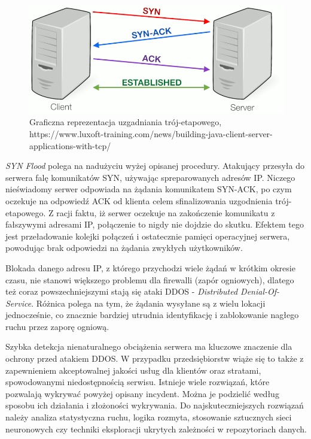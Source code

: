 \documentclass[12pt,twoside]{article}
\begin{document}
\begin{figure}[H]
	\centering
	\includegraphics[width=0.7\linewidth]{figures/3-way-handshake}
	\caption{Graficzna reprezentacja uzgadniania trój-etapowego, https://www.luxoft-training.com/news/building-java-client-server-applications-with-tcp/}
	\label{fig:3-way-handshake}
\end{figure}

\emph{SYN Flood} polega na nadużyciu wyżej opisanej procedury. Atakujący przesyła do serwera falę komunikatów SYN, używając spreparowanych adresów IP. Niczego nieświadomy serwer odpowiada na żądania komunikatem SYN-ACK, po czym oczekuje na odpowiedź ACK od klienta celem sfinalizowania uzgodnienia trój-etapowego. Z racji faktu, iż serwer oczekuje na zakończenie komunikatu z fałszywymi adresami IP, połączenie to nigdy nie dojdzie do skutku. Efektem tego jest przeładowanie kolejki połączeń i ostatecznie pamięci operacyjnej serwera, powodując brak odpowiedzi na żądania zwykłych użytkowników. \cite{DDosHowItWorks}

Blokada danego adresu IP, z którego przychodzi wiele żądań w krótkim okresie czasu, nie stanowi większego problemu dla firewalli (zapór ogniowych), dlatego też coraz powszechniejszymi stają się ataki DDOS - \emph{Distributed Denial-Of-Service}. Różnica polega na tym, że żądania wysyłane są z wielu lokacji jednocześnie, co znacznie bardziej utrudnia identyfikację i zablokowanie nagłego ruchu przez zaporę ogniową.

Szybka detekcja nienaturalnego obciążenia serwera ma kluczowe znaczenie dla ochrony przed atakiem DDOS. W przypadku przedsiębiorstw wiąże się to także z zapewnieniem akceptowalnej jakości usług dla klientów oraz stratami, spowodowanymi niedostępnością serwisu. Istnieje wiele rozwiązań, które pozwalają wykrywać powyżej opisany incydent. Można je podzielić według sposobu ich działania i złożoności wykrywania. Do najskuteczniejszych rozwiązań należy analiza statystyczna ruchu, logika rozmyta, stosowanie sztucznych sieci neuronowych czy techniki eksploracji ukrytych zależności w repozytoriach danych. \cite{DDosDetection}
\end{document}

